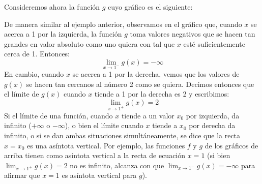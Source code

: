 \documentclass[../teoria.root.tex]{subfiles}
\begin{document}
Consideremos ahora la función \(g\) cuyo gráfico es el siguiente:
\begin{center}
\end{center}
De manera similar al ejemplo anterior, observamos en el gráfico que, cuando \(x\) se acerca a 1 por la izquierda, la función \(g\) toma valores negativos que se hacen tan grandes en valor absoluto como uno quiera con tal que \(x\) esté suficientemente cerca de 1.
Entonces:
\[\lim_{x\to1^-}g(x)=-\infty\]
En cambio, cuando \(x\) se acerca a 1 por la derecha, vemos que los valores de \(g(x)\) se hacen tan cercanos al número 2 como se quiera.
Decimos entonces que el límite de \(g(x)\) cuando \(x\) tiende a 1 por la derecha es 2 y escribimos:
\[\lim_{x\to1^+}g(x)=2\]
Si el límite de una función, cuando \(x\) tiende a un valor \(x_0\) por izquierda, da infinito (\(+\infty\) o \(-\infty\)), o bien el límite cuando \(x\) tiende a \(x_0\) por derecha da infinito, o si se dan ambas situaciones simultáneamente, se dice que la recta \(x=x_0\) es una asíntota vertical.
Por ejemplo, las funciones \(f\) y \(g\) de los gráficos de arriba tienen como asíntota vertical a la recta de ecuación \(x=1\) (si bien \(\lim_{x\to1^+}g(x)=2\) no es infinito, alcanza con que \(\lim_{x\to1^−}g(x)=-\infty\) para afirmar que \(x=1\) es asíntota vertical para \(g\)).
\end{document}

